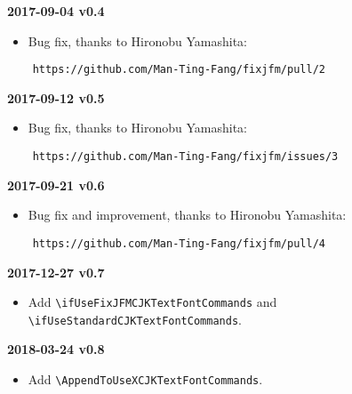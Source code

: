 \documentclass[a4paper]{article}
\newenvironment{history}[1]%
  {\noindent\textbf{#1}\nopagebreak\relax\begin{itemize}}%
  {\end{itemize}}
\begin{document}
\begin{history}{2017-09-04 v0.4}
\item Bug fix, thanks to Hironobu Yamashita:
\end{history}
\begin{verbatim}
    https://github.com/Man-Ting-Fang/fixjfm/pull/2
\end{verbatim}

\begin{history}{2017-09-12 v0.5}
\item Bug fix, thanks to Hironobu Yamashita:
\end{history}
\begin{verbatim}
    https://github.com/Man-Ting-Fang/fixjfm/issues/3
\end{verbatim}

\begin{history}{2017-09-21 v0.6}
\item Bug fix and improvement, thanks to Hironobu Yamashita:
\end{history}
\begin{verbatim}
    https://github.com/Man-Ting-Fang/fixjfm/pull/4
\end{verbatim}

\begin{history}{2017-12-27 v0.7}
\item Add \verb|\ifUseFixJFMCJKTextFontCommands| and
  \verb|\ifUseStandardCJKTextFontCommands|.
\end{history}

\begin{history}{2018-03-24 v0.8}
\item Add \verb|\AppendToUseXCJKTextFontCommands|.
\end{history}
\end{document}
